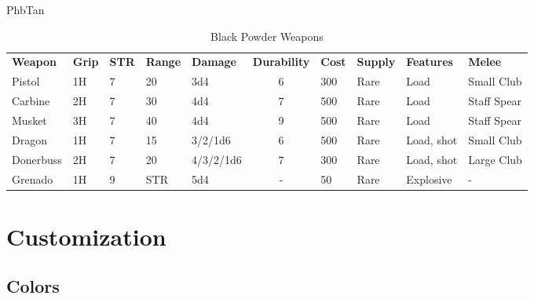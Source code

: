 \documentclass[letterpaper,twocolumn,openany,nodeprecatedcode]{dndbook}
\begin{document}
 {} {PhbTan}
\begin{table*}[b]
  \caption{\DndFontTableTitle{}Black Powder Weapons}\label{tab:colors}
  \begin{tabularx}{\linewidth}{llllXcXXXX}
    \textbf{Weapon} & \textbf{Grip} & \textbf{STR} & \textbf{Range} & \textbf{Damage} & \textbf{Durability} & \textbf{Cost} & \textbf{Supply} & \textbf{Features} & \textbf{Melee}\\
    Pistol & 1H & 7 & 20 & 3d4& 6 & 300 & Rare & Load & Small Club \\
    Carbine & 2H & 7 & 30 & 4d4& 7 & 500 & Rare & Load & Staff Spear \\
    Musket & 3H & 7 & 40 & 4d4& 9 & 500 & Rare & Load & Staff Spear \\
    Dragon & 1H & 7 & 15 & 3/2/1d6& 6 & 500 & Rare & Load, shot & Small Club \\
    Donerbuss & 2H & 7 & 20 & 4/3/2/1d6& 7 & 300 & Rare & Load, shot & Large Club \\
    Grenado & 1H & 9 & STR & 5d4& - & 50 & Rare & Explosive & - \\
  \end{tabularx}
\end{table*}

\part{Customization}

\chapter{Colors}
\end{document}
